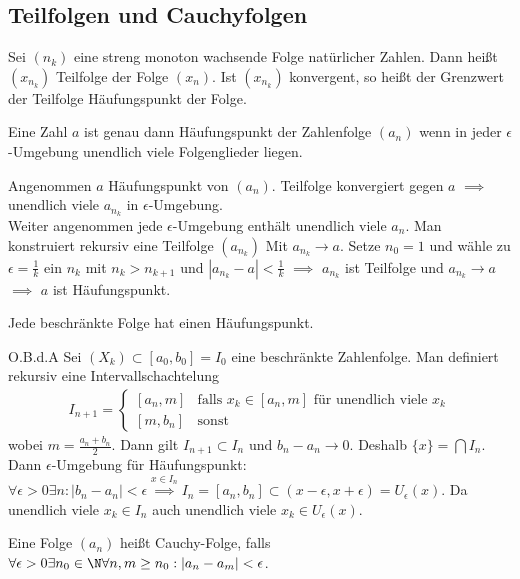 \subsection{Teilfolgen und Cauchyfolgen}
\begin{definition}
	Sei $(n_k)$ eine streng monoton wachsende Folge natürlicher Zahlen. Dann heißt $(x_{n_k})$ Teilfolge der Folge $(x_n)$. Ist $(x_{n_k})$ konvergent, so heißt der Grenzwert der Teilfolge Häufungspunkt der Folge.
\end{definition}
\begin{theorem}
	Eine Zahl $a$ ist genau dann Häufungspunkt der Zahlenfolge $(a_n)$ wenn in jeder $\epsilon$-Umgebung unendlich viele Folgenglieder liegen.
\end{theorem}
\prove Angenommen $a$ Häufungspunkt von $(a_n)$. Teilfolge konvergiert gegen $a$ $\implies$ unendlich viele $a_{n_k}$ in $\epsilon$-Umgebung.\\ Weiter angenommen jede $\epsilon$-Umgebung enthält unendlich viele $a_n$. Man konstruiert rekursiv eine Teilfolge $(a_{n_k})$ Mit $a_{n_k}\to a$. Setze $n_0=1$ und wähle zu $\epsilon =\frac{1}{k}$ ein $n_k$ mit $n_k>n_{k+1}$ und $|a_{n_k}-a|<\frac{1}{k}$ $\implies$ $a_{n_k}$ ist Teilfolge und $a_{n_k}\to a$ $\implies$ $a$ ist Häufungspunkt. 
\begin{theorem}
	Jede beschränkte Folge hat einen Häufungspunkt.
\end{theorem}
\prove O.B.d.A Sei $(X_k)\subset [a_0,b_0]=I_0$ eine beschränkte Zahlenfolge. Man definiert rekursiv eine Intervallschachtelung
\begin{align*}
	I_{n+1}=\begin{cases}
		[a_n,m]& \text{falls $x_k\in [a_n,m]$ für unendlich viele $x_k$}\\
		[m, b_n]& \text{sonst}
	\end{cases}
\end{align*}
wobei $m=\frac{a_n+b_n}{2}$. Dann gilt $I_{n+1}\subset I_n$ und $b_n-a_n\to 0$. Deshalb $\{x\}=\bigcap I_n$. Dann $\epsilon$-Umgebung für Häufungspunkt: $\forall \epsilon > 0 \exists n: |b_n-a_n|<\epsilon \overset{x\in I_n}{\implies} I_n = [a_n,b_n] \subset (x-\epsilon,x+\epsilon) = U_{\epsilon}(x)$. Da unendlich viele $x_k \in I_n$ auch unendlich viele $x_k \in U_{\epsilon}(x)$.
\begin{definition}
	Eine Folge $(a_n)$ heißt Cauchy-Folge, falls $\forall \epsilon > 0 \exists n_0 \in \N \forall n,m \geq n_0: |a_n-a_m|<\epsilon$.
\end{definition}
